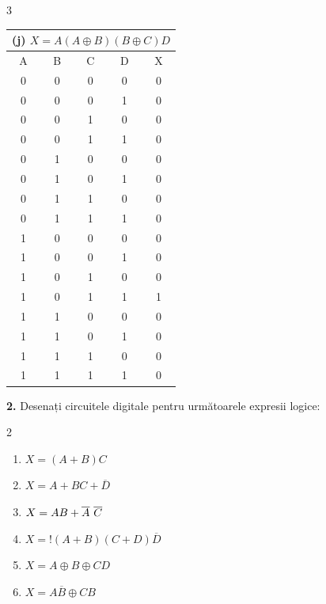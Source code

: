 \documentclass[a4paper]{article}
\begin{document}
\begin{multicols}{3}
\begin{tabular}{|c|c|c|c||c|}
\multicolumn{5}{|c|}{(j) $X = A(A \oplus B)(B \oplus C)D$} \\ \hline
A & B & C & D & X \\ \hline
0 & 0 & 0 & 0 & 0 \\ \hline
0 & 0 & 0 & 1 & 0 \\ \hline
0 & 0 & 1 & 0 & 0 \\ \hline
0 & 0 & 1 & 1 & 0 \\ \hline
0 & 1 & 0 & 0 & 0 \\ \hline
0 & 1 & 0 & 1 & 0 \\ \hline
0 & 1 & 1 & 0 & 0 \\ \hline
0 & 1 & 1 & 1 & 0 \\ \hline
1 & 0 & 0 & 0 & 0 \\ \hline
1 & 0 & 0 & 1 & 0 \\ \hline
1 & 0 & 1 & 0 & 0 \\ \hline
1 & 0 & 1 & 1 & 1 \\ \hline
1 & 1 & 0 & 0 & 0 \\ \hline
1 & 1 & 0 & 1 & 0 \\ \hline
1 & 1 & 1 & 0 & 0 \\ \hline
1 & 1 & 1 & 1 & 0 \\ \hline
\end{tabular}
\end{multicols}

\textbf{2.} Desenați circuitele digitale pentru următoarele expresii logice:
\begin{multicols}{2}
\begin{enumerate}[label=(\alph*)]
    \item $X = (A + B)C$
    \item $X = A + BC + \overline{D}$
    \item $X = AB + \overline{A}\hspace{0.12cm}\overline{C}$
    \item $X = !(A + B)(C + D)\overline{D}$
    \item $X = A \oplus B \oplus CD$
    \item $X = A\overline{B}\oplus CB$
\end{enumerate}
\end{multicols}
\end{document}
